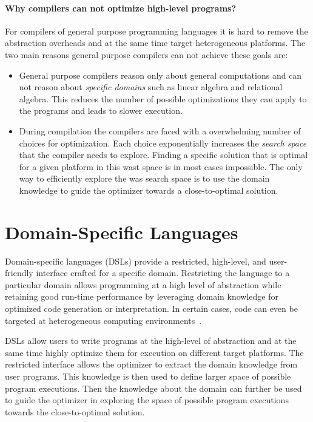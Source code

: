 \paragraph{Why compilers can not optimize high-level programs?} For compilers of general purpose programming languages it is hard to remove the abstraction overheads and at the same time target heterogeneous platforms. The two main
 reasons general purpose compilers can not achieve these goals are:\begin{itemize}

 \item General purpose compilers reason only about general computations and can not reason
   about \emph{specific domains} such as linear algebra and relational algebra. This reduces
   the number of possible optimizations they can apply to the programs and leads to
   slower execution.

 \item During compilation the compilers are faced with a overwhelming number of choices
   for optimization. Each choice exponentially increases the \emph{search space}
   that the compiler needs to explore. Finding a specific solution that is optimal
   for a given platform in this wast space is in most cases impossible. The only way
   to efficiently explore the was search space is to use the domain knowledge to guide
   the optimizer towards a close-to-optimal solution.
 \end{itemize}

\section{Domain-Specific Languages}
\label{sec:domain-specific-languages}

Domain-specific languages (DSLs) provide a restricted,
 high-level, and user-friendly interface crafted for a specific domain.
 Restricting the language to a particular domain allows programming at
 a high level of abstraction while retaining good run-time performance
 by leveraging domain knowledge for optimized code generation or
 interpretation.  In certain cases, code can even be targeted at
 heterogeneous computing environments~\cite{rompf_optimizing_2013}.

DSLs allow users to write programs at the high-level of abstraction and at the
 same time highly optimize them for execution on different target platforms. The restricted interface allows the optimizer to extract the domain knowledge from user programs. This knowledge is then used to define larger space of possible program executions. Then the knowledge about the domain
 can further be used to guide the optimizer in exploring the space of possible program executions
 towards the close-to-optimal solution.

